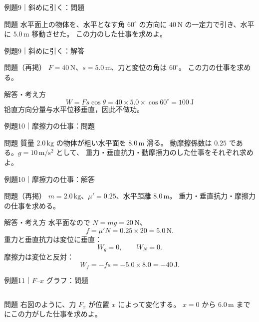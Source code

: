 \documentclass[notheorems,aspectratio=169]{beamer}
\newcommand{\qcard}[1]{%
  \begin{block}{問題}\centering\large #1\end{block}}
\newcommand{\qsmall}[1]{%
  \begin{block}{問題（再掲）}\small #1\end{block}}
\newcommand{\acard}[1]{%
  \begin{exampleblock}{解答・考え方}#1\end{exampleblock}}
\begin{document}
\begin{frame}{例題9｜斜めに引く：問題}
  \vfill
  \qcard{
    水平面上の物体を、水平となす角 $60^\circ$ の方向に
    $40\,\mathrm N$ の一定力で引き、水平に $5.0\,\mathrm m$ 移動させた。
    この力のした仕事を求めよ。
  }
  \vfill
\end{frame}

\begin{frame}{例題9｜斜めに引く：解答}
  \qsmall{
    $F=40\,\mathrm N$、$s=5.0\,\mathrm m$、力と変位の角は $60^\circ$。
    この力の仕事を求める。
  }
  \acard{
    \[
      W=Fs\cos\theta
      =40\times5.0\times\cos60^\circ
      =\boxed{100\,\mathrm J}
    \]
    铅直方向分量与水平位移垂直，因此不做功。
  }
\end{frame}

\begin{frame}{例題10｜摩擦力の仕事：問題}
  \vfill
  \qcard{
    質量 $2.0\,\mathrm{kg}$ の物体が粗い水平面を $8.0\,\mathrm m$ 滑る。
    動摩擦係数は $0.25$ である。$g=10\,\mathrm{m/s^2}$ として、
    重力・垂直抗力・動摩擦力のした仕事をそれぞれ求めよ。
  }
  \vfill
\end{frame}

\begin{frame}{例題10｜摩擦力の仕事：解答}
  \qsmall{
    $m=2.0\,\mathrm{kg}$、$\mu'=0.25$、水平距離 $8.0\,\mathrm m$。
    重力・垂直抗力・摩擦力の仕事を求める。
  }
  \acard{
    水平面なので $N=mg=20\,\mathrm N$、
    \[
      f=\mu'N=0.25\times20=5.0\,\mathrm N.
    \]
    重力と垂直抗力は変位に垂直：
    \[
      \boxed{W_g=0,\qquad W_N=0}.
    \]
    摩擦力は変位と反対：
    \[
      W_f=-fs=-5.0\times8.0=\boxed{-40\,\mathrm J}.
    \]
  }
\end{frame}

\begin{frame}{例題11｜$F$--$x$ グラフ：問題}
  \begin{columns}[T,onlytextwidth]
    \qcard{
      右図のように、力 $F_x$ が位置 $x$ によって変化する。
      $x=0$ から $6.0\,\mathrm m$ までにこの力がした仕事を求めよ。
    }
    \centering
  \end{columns}
\end{frame}
\end{document}
